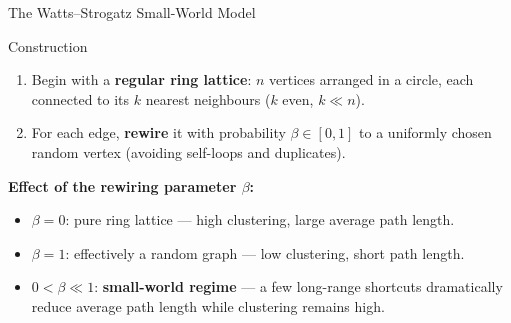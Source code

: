 \documentclass[t]{beamer}
\begin{document}
\begin{frame}{The Watts--Strogatz Small-World Model}

\begin{block}{Construction}
  \begin{enumerate}
    \item Begin with a \textbf{regular ring lattice}: $n$ vertices arranged in a circle,
          each connected to its $k$ nearest neighbours ($k$ even, $k \ll n$).
    \item For each edge, \textbf{rewire} it with probability $\beta \in [0,1]$
          to a uniformly chosen random vertex (avoiding self-loops and duplicates).
  \end{enumerate}
\end{block}

\medskip

\textbf{Effect of the rewiring parameter $\beta$:}
\begin{itemize}
  \item $\beta = 0$: pure ring lattice — high clustering, large average path length.
  \item $\beta = 1$: effectively a random graph — low clustering, short path length.
  \item $0 < \beta \ll 1$: \textbf{small-world regime} — a few long-range shortcuts
        dramatically reduce average path length while clustering remains high.
\end{itemize}

\end{frame}

\end{document}
